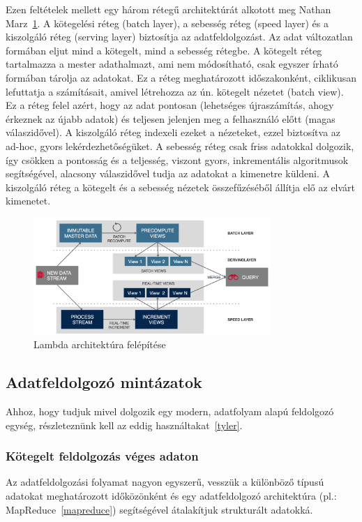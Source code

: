 \documentclass[a4paper,12pt]{article}
\begin{document}
Ezen feltételek mellett egy három rétegű architektúrát alkotott meg Nathan Marz~\ref{lambda}. A kötegelési réteg (batch layer), a sebesség réteg (speed layer) és a kiszolgáló réteg (serving layer) biztosítja az adatfeldolgozást. Az adat változatlan formában eljut mind a kötegelt, mind a sebesség rétegbe. A kötegelt réteg tartalmazza a mester adathalmazt, ami nem módosítható, csak egyszer írható formában tárolja az adatokat. Ez a réteg meghatározott időszakonként, ciklikusan lefuttatja a számításait, amivel létrehozza az ún. kötegelt nézetet (batch view). Ez a réteg felel azért, hogy az adat pontosan (lehetséges újraszámítás, ahogy érkeznek az újabb adatok) és teljesen jelenjen meg a felhasználó előtt (magas válaszidővel).  A kiszolgáló réteg indexeli ezeket a nézeteket, ezzel biztosítva az ad-hoc, gyors lekérdezhetőségüket. \linebreak
A sebesség réteg csak friss adatokkal dolgozik, így csökken a pontosság és a teljesség, viszont gyors, inkrementális algoritmusok segítségével, alacsony válaszidővel tudja az adatokat a kimenetre küldeni. A kiszolgáló réteg a kötegelt és a sebesség nézetek összefűzéséből állítja elő az elvárt kimenetet.

\begin{figure}[ht!]
\centering
\includegraphics[width=90mm]{img/lambda.png}
\caption{Lambda architektúra felépítése \label{lambda}}
\end{figure}


\subsection{Adatfeldolgozó mintázatok}
Ahhoz, hogy tudjuk mivel dolgozik egy modern, adatfolyam alapú feldolgozó egység, részleteznünk kell az eddig használtakat~\ref{tyler}.

\subsubsection{Kötegelt feldolgozás véges adaton}
Az adatfeldolgozási folyamat nagyon egyszerű, vesszük a különböző típusú adatokat meghatározott időközönként és egy adatfeldolgozó architektúra (pl.: MapReduce~\ref{mapreduce}) segítségével átalakítjuk strukturált adatokká.
\end{document}

